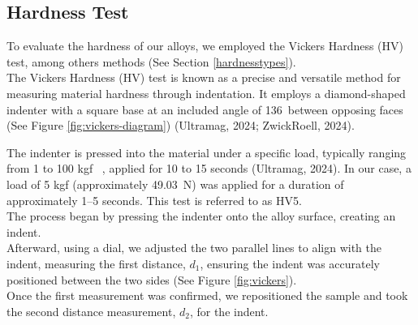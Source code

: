 \documentclass{article}
\begin{document}
\subsection{Hardness Test}
To evaluate the hardness of our alloys, we employed the Vickers Hardness (HV) test, among others methods (See Section \ref{hardnesstypes}).\\[8pt]
The Vickers Hardness (HV) test is known as a precise and versatile method for measuring material hardness through indentation. It employs a diamond-shaped indenter with a square base at an included angle of 136\textdegree \ between opposing faces (See Figure \ref{fig:vickers-diagram}) (Ultramag, 2024; ZwickRoell, 2024).\\[8pt]
\begin{minipage}{0.55\textwidth}
    The indenter is pressed into the material under a specific load, typically ranging from 1 to 100 kgf \, \footnotemark, applied for 10 to 15 seconds (Ultramag, 2024). In our case, a load of 5 kgf (approximately \SI{49.03}{\newton}) was applied for a duration of approximately 1–5 seconds. This test is referred to as HV5.\\[8pt]
    The process began by pressing the indenter onto the alloy surface, creating an indent.\\[8pt] 
    Afterward, using a dial, we adjusted the two parallel lines to align with the indent, measuring the first distance, \(d_1\), ensuring the indent was accurately positioned between the two sides (See Figure \ref{fig:vickers}).\\[8pt]
    Once the first measurement was confirmed, we repositioned the sample and took the second distance measurement, \(d_2\), for the indent.
\end{minipage}\hspace{1em}
\end{document}
